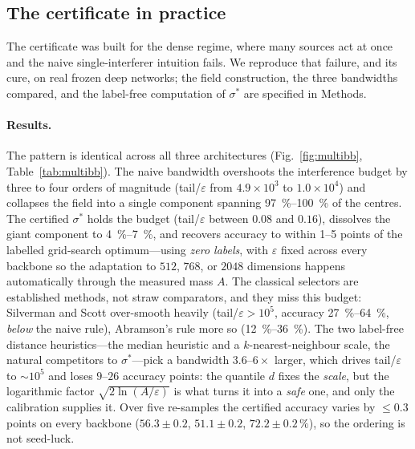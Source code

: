 \documentclass[10pt,twocolumn]{article}
\newcommand{\sstar}{\sigma^{*}}
\begin{document}
\subsection{The certificate in practice}\label{sec:flagship}
The certificate was built for the dense regime, where many sources act at once and the naive single-interferer intuition fails. We reproduce that failure, and its cure, on real frozen deep networks; the field construction, the three bandwidths compared, and the label-free computation of $\sstar$ are specified in Methods.

\paragraph{Results.} The pattern is identical across all three architectures (Fig.~\ref{fig:multibb}, Table~\ref{tab:multibb}). The naive bandwidth overshoots the interference budget by three to four orders of magnitude (tail/$\varepsilon$ from $4.9\times10^3$ to $1.0\times10^4$) and collapses the field into a single component spanning \SIrange{97}{100}{\percent} of the centres. The certified $\sstar$ holds the budget (tail/$\varepsilon$ between $0.08$ and $0.16$), dissolves the giant component to \SIrange{4}{7}{\percent}, and recovers accuracy to within \SIrange{1}{5}{} points of the labelled grid-search optimum---using \emph{zero labels}, with $\varepsilon$ fixed across every backbone so the adaptation to $512$, $768$, or $2048$ dimensions happens automatically through the measured mass $A$. The classical selectors are established methods, not straw comparators, and they miss this budget: Silverman and Scott over-smooth heavily (tail/$\varepsilon>10^5$, accuracy \SIrange{27}{64}{\percent}, \emph{below} the naive rule), Abramson's rule more so (\SIrange{12}{36}{\percent}). The two label-free distance heuristics---the median heuristic and a $k$-nearest-neighbour scale, the natural competitors to $\sstar$---pick a bandwidth $3.6$--$6\times$ larger, which drives tail/$\varepsilon$ to $\sim\!10^5$ and loses $9$--$26$ accuracy points: the quantile $d$ fixes the \emph{scale}, but the logarithmic factor $\sqrt{2\ln(A/\varepsilon)}$ is what turns it into a \emph{safe} one, and only the calibration supplies it. Over five re-samples the certified accuracy varies by $\le0.3$ points on every backbone ($56.3\pm0.2$, $51.1\pm0.2$, $72.2\pm0.2\,\%$), so the ordering is not seed-luck.
\end{document}
